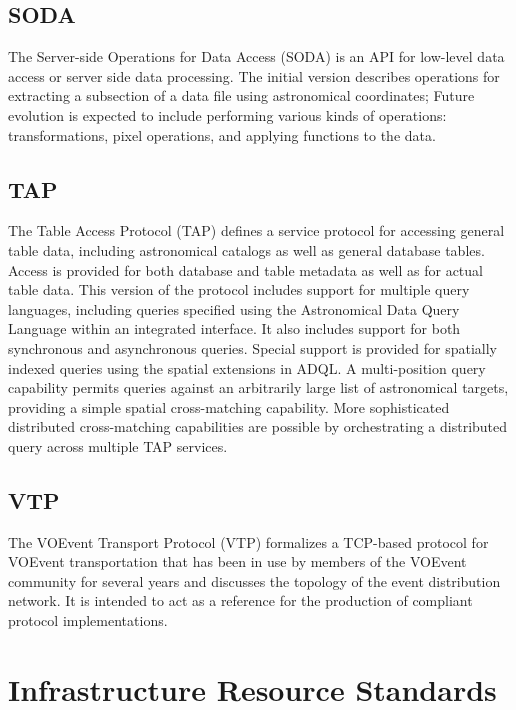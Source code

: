\documentclass[11pt,a4paper]{ivoa}
\begin{document}
\subsection{SODA} 

The Server-side Operations for Data Access (SODA) \citep{2017ivoa.spec.0517B} is an API for low-level data access or server side 
data processing. The initial version describes operations for extracting a subsection of a data
file using astronomical coordinates; Future evolution is expected to include performing 
various kinds of operations: transformations, pixel operations, and applying functions to the data.

\subsection{TAP}
\label{dal:tap}

The Table Access Protocol (TAP) \citep{2019ivoa.spec.0927D} defines a service protocol for accessing general table data, 
including astronomical catalogs as well as general database tables. Access is provided 
for both database and table metadata as well as for actual table data. This version of 
the protocol includes support for multiple query languages, including queries specified 
using the Astronomical Data Query Language within an integrated interface. It also 
includes support for both synchronous and asynchronous queries. Special support is 
provided for spatially indexed queries using the spatial extensions in ADQL. A multi-position 
query capability permits queries against an arbitrarily large list of astronomical targets, 
providing a simple spatial cross-matching capability. More sophisticated distributed 
cross-matching capabilities are possible by orchestrating a distributed query across 
multiple TAP services. 

\subsection{VTP}

The VOEvent Transport Protocol (VTP) \citep{2017ivoa.spec.0320S} formalizes a TCP-based protocol for VOEvent transportation 
that has been in use by members of the VOEvent community for several years and discusses 
the topology of the event distribution network. It is intended to act as a reference for 
the production of compliant protocol implementations. 

\section{Infrastructure Resource Standards}
\label{gws}
\end{document}
